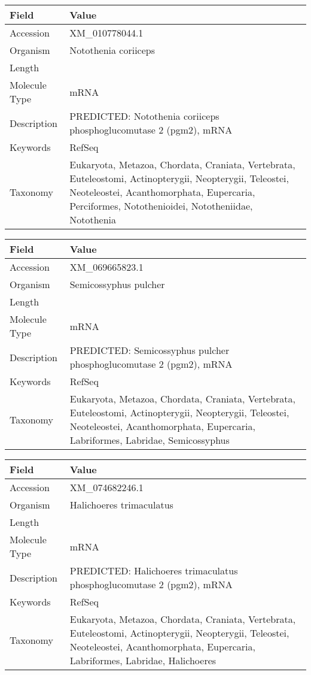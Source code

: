 \documentclass[10pt]{article}
\begin{document}
{\footnotesize
\begin{longtable}{>{\raggedright\arraybackslash}p{4.5cm} >{\raggedright\arraybackslash}p{11.5cm}}
\textbf{Field} & \textbf{Value} \\
\hline
Accession & XM\_010778044.1 \\
Organism & Notothenia coriiceps \\
Length & 2904 \\
Molecule Type & mRNA \\
Description & PREDICTED: Notothenia coriiceps phosphoglucomutase 2 (pgm2), mRNA \\
Keywords & RefSeq \\
Taxonomy & Eukaryota, Metazoa, Chordata, Craniata, Vertebrata, Euteleostomi, Actinopterygii, Neopterygii, Teleostei, Neoteleostei, Acanthomorphata, Eupercaria, Perciformes, Notothenioidei, Nototheniidae, Notothenia \\
\end{longtable}
}

{\footnotesize
\begin{longtable}{>{\raggedright\arraybackslash}p{4.5cm} >{\raggedright\arraybackslash}p{11.5cm}}
\textbf{Field} & \textbf{Value} \\
\hline
Accession & XM\_069665823.1 \\
Organism & Semicossyphus pulcher \\
Length & 3222 \\
Molecule Type & mRNA \\
Description & PREDICTED: Semicossyphus pulcher phosphoglucomutase 2 (pgm2), mRNA \\
Keywords & RefSeq \\
Taxonomy & Eukaryota, Metazoa, Chordata, Craniata, Vertebrata, Euteleostomi, Actinopterygii, Neopterygii, Teleostei, Neoteleostei, Acanthomorphata, Eupercaria, Labriformes, Labridae, Semicossyphus \\
\end{longtable}
}

{\footnotesize
\begin{longtable}{>{\raggedright\arraybackslash}p{4.5cm} >{\raggedright\arraybackslash}p{11.5cm}}
\textbf{Field} & \textbf{Value} \\
\hline
Accession & XM\_074682246.1 \\
Organism & Halichoeres trimaculatus \\
Length & 2901 \\
Molecule Type & mRNA \\
Description & PREDICTED: Halichoeres trimaculatus phosphoglucomutase 2 (pgm2), mRNA \\
Keywords & RefSeq \\
Taxonomy & Eukaryota, Metazoa, Chordata, Craniata, Vertebrata, Euteleostomi, Actinopterygii, Neopterygii, Teleostei, Neoteleostei, Acanthomorphata, Eupercaria, Labriformes, Labridae, Halichoeres \\
\end{longtable}
}
\end{document}
